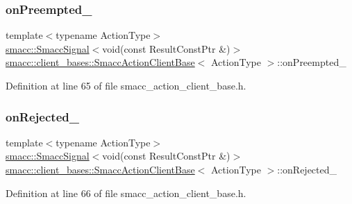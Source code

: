 \subsubsection{\texorpdfstring{on\+Preempted\+\_\+}{onPreempted\_}}
{\footnotesize\ttfamily template$<$typename Action\+Type$>$ \\
\hyperlink{classsmacc_1_1SmaccSignal}{smacc\+::\+Smacc\+Signal}$<$void(const Result\+Const\+Ptr \&)$>$ \hyperlink{classsmacc_1_1client__bases_1_1SmaccActionClientBase}{smacc\+::client\+\_\+bases\+::\+Smacc\+Action\+Client\+Base}$<$ Action\+Type $>$\+::on\+Preempted\+\_\+}



Definition at line 65 of file smacc\+\_\+action\+\_\+client\+\_\+base.\+h.

\mbox{\label{classsmacc_1_1client__bases_1_1SmaccActionClientBase_a4c878cbf2684701323e2b36668f7d721}} 
\subsubsection{\texorpdfstring{on\+Rejected\+\_\+}{onRejected\_}}
{\footnotesize\ttfamily template$<$typename Action\+Type$>$ \\
\hyperlink{classsmacc_1_1SmaccSignal}{smacc\+::\+Smacc\+Signal}$<$void(const Result\+Const\+Ptr \&)$>$ \hyperlink{classsmacc_1_1client__bases_1_1SmaccActionClientBase}{smacc\+::client\+\_\+bases\+::\+Smacc\+Action\+Client\+Base}$<$ Action\+Type $>$\+::on\+Rejected\+\_\+}



Definition at line 66 of file smacc\+\_\+action\+\_\+client\+\_\+base.\+h.

\mbox{\label{classsmacc_1_1client__bases_1_1SmaccActionClientBase_afa1d615e16c9e825d815a3a3ccaa61df}} 
